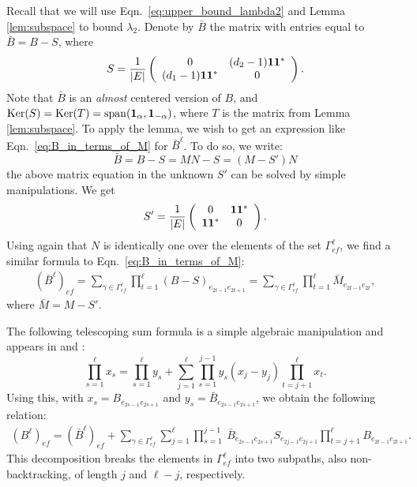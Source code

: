 Recall that we will use
Eqn.~\eqref{eq:upper_bound_lambda2} and
Lemma \ref{lem:subspace} to bound $\lambda_2$.
Denote by $\bar{B}$ the matrix with entries equal to
$\bar{B} = B - S$,
where
\[
 S = \frac{1}{|E|}
 \left(
 \begin{array}{cc} 
 0 & (d_2 - 1) \mathbf{1} \mathbf{1}^* \\
 (d_1 - 1) \mathbf{1} \mathbf{1}^* & 0 
 \end{array}
 \right ).
\]
Note that $\bar{B}$ is an \textit{almost} centered version of $B$,
and $\mathrm{Ker} ( S ) = \mathrm{Ker}(T) = \mathrm{span} (\mathbf{1}_{\alpha}, \mathbf{1}_{-\alpha} ) $, 
where $T$ is the matrix from Lemma \ref{lem:subspace}.
To apply the lemma, we wish to get an expression like Eqn.~\eqref{eq:B_in_terms_of_M} for $\bar{B}^{\ell}$. To do so, we write:
\[
\bar{B} = B - S = M N - S = (M - S') N
\]
the above matrix equation in the unknown $S'$ can be solved by simple manipulations. We get
\[
S'=\frac{1}{|E|} \left(
 \begin{array}{cc} 
 0 & \mathbf{1} \mathbf{1}^* \\
  \mathbf{1} \mathbf{1}^* & 0 
 \end{array}
 \right ).
\]
Using again that $N$ is identically one over the elements of the set 
$\Gamma^{\ell}_{ef}$, 
we find a similar formula to Eqn.~\eqref{eq:B_in_terms_of_M}:
\begin{align}\label{eq:barB_in_terms_of_M}
(\bar{B}^\ell)_{ef}
=
\sum_{\gamma \in \Gamma^\ell_{ef}} 
\prod_{t=1}^{\ell}
\left( B - S \right)_{e_{2t-1} e_{2t+1}}
=
\sum_{\gamma \in \Gamma^\ell_{ef}} 
\prod_{t=1}^{\ell}
\bar{M}_{e_{2t-1} e_{2t}},
\end{align}
where $\bar{M}=M-S'$. 


The following telescoping sum formula is a simple algebraic manipulation 
and appears in \citet*{massoulie2013} 
and \citet*{bordenave2015a}: 
\begin{equation*}
\prod_{s=1}^\ell x_s = \prod_{s=1}^\ell y_s + 
\sum_{j=1}^\ell \prod_{s=1}^{j-1} y_s (x_j - y_j) \prod_{t=j+1}^\ell x_t .
\end{equation*}
Using this, 
with $x_s = B_{e_{2s-1} e_{2s+1}}$ 
and $y_s = \bar{B}_{e_{2s-1} e_{2s+1}}$,
we obtain the following relation:
\begin{align}
\label{B_dec1}
( B^{\ell} )_{ef} 
= 
( \bar{B}^{\ell} )_{ef} 
+ 
\sum_{\gamma\in \Gamma^{\ell}_{ef}} 
\sum_{j=1}^{\ell} 
\prod_{s=1}^{j-1}\
\bar{B}_{e_{2s-1} e_{2s+1}}
S_{e_{2j-1} e_{2j+1}}
\prod_{t=j+1}^{\ell} B_{e_{2t-1} e_{2t+1}}.
\end{align}
This decomposition breaks the elements in $\Gamma^{\ell}_{ef}$ 
into two subpaths, also non-backtracking, 
of length $j$ and $\ell-j$, respectively. 

